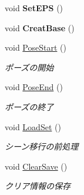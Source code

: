 \begin{DoxyCompactItemize}
\mbox{\label{class_a_l_l_tower_a927db4929e3e5071252f60212e46f1c9}} 
void {\bfseries Set\+E\+PS} ()
\item 
\mbox{\label{class_a_l_l_tower_aad2dd96c6d608e268a61000c4af24792}} 
void {\bfseries Creat\+Base} ()
\item 
void \hyperlink{class_a_l_l_tower_ae37b91b8eb784a8d1c96220233afd76f}{Pose\+Start} ()
\begin{DoxyCompactList}\small\item\em ポーズの開始 \end{DoxyCompactList}\item 
void \hyperlink{class_a_l_l_tower_ae91a9023605bd83d59aee9eda6f72779}{Pose\+End} ()
\begin{DoxyCompactList}\small\item\em ポーズの終了 \end{DoxyCompactList}\item 
void \hyperlink{class_a_l_l_tower_abb9823ebb19ac7ac19ca871b55af1977}{Load\+Set} ()
\begin{DoxyCompactList}\small\item\em シーン移行の前処理 \end{DoxyCompactList}\item 
void \hyperlink{class_a_l_l_tower_af6aed1fd1193a72df854ad4970b9d174}{Clear\+Save} ()
\begin{DoxyCompactList}\small\item\em クリア情報の保存 \end{DoxyCompactList}\end{DoxyCompactItemize}
